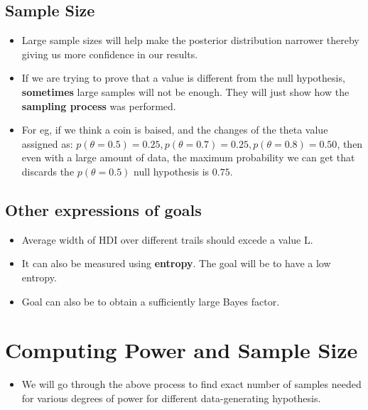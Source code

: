 \documentclass[a4paper]{article}
\begin{document}
\subsection{Sample Size}
\begin{itemize}
    \item Large sample sizes will help make the posterior distribution narrower thereby giving us more confidence in our results. 
    \item If we are trying to prove that a value is different from the null hypothesis, \textbf{sometimes} large samples will not be enough. They will just show how the \textbf{sampling process} was performed.  
    \item For eg, if we think a coin is baised, and the changes of the theta value assigned as: $ p(\theta = 0.5)=0.25 , p(\theta =0.7) =0.25, p(\theta=0.8) =0.50 $, then even with a large amount of data, the maximum probability we can get that discards the  $p(\theta=0.5)$ null hypothesis is $0.75$.
\end{itemize}
\subsection{Other expressions of goals}
\begin{itemize}
    \item Average width of HDI over different trails should excede a value L.
    \item It can also be measured using \textbf{entropy}. The goal will be to have a low entropy.  
    \item Goal can also be to obtain a sufficiently large Bayes factor.
\end{itemize}
\section{Computing Power and Sample Size}
\begin{itemize}
    \item We will go through the above process to find exact number of samples needed for various degrees of power for different data-generating hypothesis.
\end{itemize}
\end{document}
